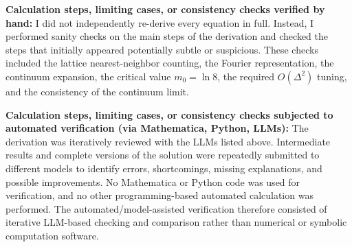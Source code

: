 \documentclass[11pt]{article}
\begin{document}
	\textbf{Calculation steps, limiting cases, or consistency checks verified by hand:} I did not independently re-derive every equation in full. Instead, I performed sanity checks on the main steps of the derivation and checked the steps that initially appeared potentially subtle or suspicious. These checks included the lattice nearest-neighbor counting, the Fourier representation, the continuum expansion, the critical value $m_0=\ln 8$, the required $O(\Delta^2)$ tuning, and the consistency of the continuum limit.
	
	\textbf{Calculation steps, limiting cases, or consistency checks subjected to automated verification (via Mathematica, Python, LLMs):} The derivation was iteratively reviewed with the LLMs listed above. Intermediate results and complete versions of the solution were repeatedly submitted to different models to identify errors, shortcomings, missing explanations, and possible improvements. No Mathematica or Python code was used for verification, and no other programming-based automated calculation was performed. The automated/model-assisted verification therefore consisted of iterative LLM-based checking and comparison rather than numerical or symbolic computation software.
	
	
\end{document}
